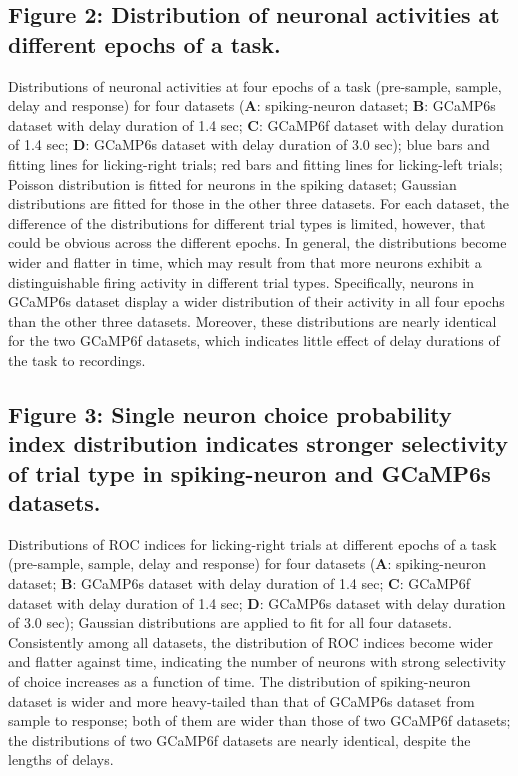 \documentclass[12pt, oneside]{nature}
\begin{document}
\subsection{Figure 2: Distribution of neuronal activities at different epochs of a task.}
Distributions of neuronal activities at four epochs of a task (pre-sample,
sample, delay and response) for four datasets (\textbf{A}: spiking-neuron
dataset; \textbf{B}: GCaMP6s dataset with delay duration of 1.4 sec; 
\textbf{C}: GCaMP6f dataset with delay duration of 1.4 sec; 
\textbf{D}: GCaMP6s dataset with delay duration of 3.0 sec); 
blue bars and fitting lines for licking-right
trials; red bars and fitting lines for licking-left trials; Poisson distribution is fitted
for neurons in the spiking dataset; Gaussian distributions are fitted for those in the other three datasets. 
For each dataset, the difference of
the distributions for different trial types is limited, however, that could be obvious across
the different epochs. In general, the distributions become wider and flatter in
time, which may result from that more neurons exhibit a distinguishable firing
activity in different trial types. Specifically, neurons in GCaMP6s dataset display
a wider distribution of their activity in all four epochs than the other three datasets.
Moreover, these distributions are nearly identical for the two
GCaMP6f datasets, which indicates little effect of delay durations of the task to recordings.

\subsection{Figure 3: Single neuron choice probability index distribution indicates stronger
selectivity of trial type in spiking-neuron and GCaMP6s datasets.}
Distributions of ROC indices for licking-right trials at different epochs of a task
(pre-sample, sample, delay and response) for four datasets (\textbf{A}: spiking-neuron
dataset; \textbf{B}: GCaMP6s dataset with delay duration of 1.4 sec; 
\textbf{C}: GCaMP6f dataset with delay duration of 1.4 sec; 
\textbf{D}: GCaMP6s dataset with delay duration of 3.0 sec); Gaussian distributions are applied
to fit for all four datasets. Consistently among all datasets, the distribution of ROC indices
become wider and flatter against time, indicating the number of neurons with strong
selectivity of choice increases as a function of time. The distribution of spiking-neuron dataset
is wider and more heavy-tailed than that of GCaMP6s dataset from sample to response;
both of them are wider than those of two GCaMP6f datasets; the distributions of two GCaMP6f datasets
are nearly identical, despite the lengths of delays.
\end{document}
